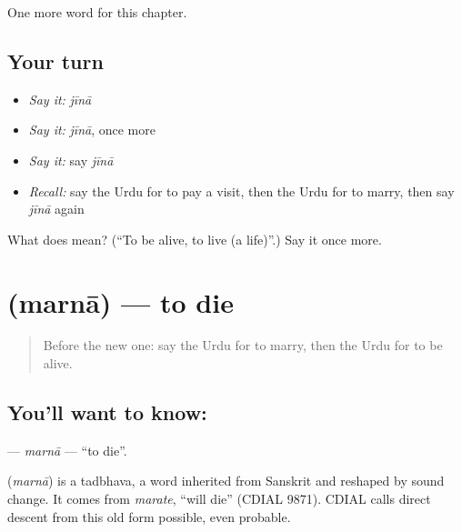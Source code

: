 \begin{grammarlens}[title={What you've built}]
One more word for this chapter.
\end{grammarlens}

\subsection*{Your turn}
\begin{itemize}
\raggedright
  \item \emph{Say it:} \emph{jīnā}
  \item \emph{Say it:} \emph{jīnā}, once more
  \item \emph{Say it:} say \emph{jīnā}
  \item \emph{Recall:} say the Urdu for to pay a visit, then the Urdu for to marry, then say \emph{jīnā} again
\end{itemize}

\begin{tcolorbox}[breakable,colback=teal!4,colframe=teal!35!black,title={Before you move on}]
What does  mean? (\textquotedblleft{}To be alive, to live (a life)\textquotedblright{}.) Say it once more.
\end{tcolorbox}
\section[\texorpdfstring{\ur{مرنا} (marnā)}{مرنا (marnā)}]{ (marnā) — to die}

\label{lesson:UR-C183-marna}



\begin{quote}
Before the new one: say the Urdu for to marry, then the Urdu for to be alive.
\end{quote}

\subsection*{You'll want to know: }
\textbf{} — \emph{marnā} — \textquotedblleft{}to die\textquotedblright{}.

\begin{cousinweb}
\textbf{} (\emph{marnā}) is a tadbhava, a word inherited from Sanskrit and reshaped by sound change. It comes from \emph{marate}, \textquotedblleft{}will die\textquotedblright{} (CDIAL 9871). CDIAL calls direct descent from this old form possible, even probable.
\end{cousinweb}

